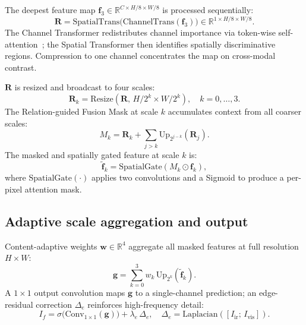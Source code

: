 \documentclass[a4paper,fleqn]{cas-dc}
\begin{document}
The deepest feature map $\mathbf{f}_3\!\in\!\mathbb{R}^{C\times H/8\times W/8}$
is processed sequentially:
\begin{equation}
  \mathbf{R} =
    \mathrm{SpatialTrans}\!\bigl(\mathrm{ChannelTrans}(\mathbf{f}_3)\bigr)
    \in \mathbb{R}^{1\times H/8\times W/8}.
  \label{eq:relmap}
\end{equation}
The Channel Transformer redistributes channel importance via token-wise
self-attention~\cite{t2tvit2021}; the Spatial Transformer then identifies
spatially discriminative regions.  Compression to one channel concentrates
the map on cross-modal contrast.

$\mathbf{R}$ is resized and broadcast to four scales:
\begin{equation}
  \mathbf{R}_k = \mathrm{Resize}(\mathbf{R},\,H/2^k\!\times\!W/2^k),
  \quad k=0,\ldots,3.
  \label{eq:broadcast}
\end{equation}
The Relation-guided Fusion Mask at scale $k$ accumulates context from all
coarser scales:
\begin{equation}
  M_k = \mathbf{R}_k + \textstyle\sum_{j>k}\mathrm{Up}_{2^{j-k}}(\mathbf{R}_j).
  \label{eq:mask}
\end{equation}
The masked and spatially gated feature at scale $k$ is:
\begin{equation}
  \tilde{\mathbf{f}}_k
    = \mathrm{SpatialGate}(M_k \odot \mathbf{f}_k),
  \label{eq:gate}
\end{equation}
where $\mathrm{SpatialGate}(\cdot)$ applies two convolutions and a Sigmoid
to produce a per-pixel attention mask.

\subsection{Adaptive scale aggregation and output}
\label{sec:method:agg}

Content-adaptive weights $\mathbf{w}\!\in\!\mathbb{R}^4$ aggregate all
masked features at full resolution $H\!\times\!W$:
\begin{equation}
  \mathbf{g} = \textstyle\sum_{k=0}^{3} w_k\,\mathrm{Up}_{2^k}(\tilde{\mathbf{f}}_k).
  \label{eq:agg}
\end{equation}
A $1\!\times\!1$ output convolution maps $\mathbf{g}$ to a single-channel
prediction; an edge-residual correction $\Delta_e$ reinforces
high-frequency detail:
\begin{equation}
  I_f = \sigma\!\bigl(\mathrm{Conv}_{1\times1}(\mathbf{g})\bigr)
        + \lambda_e\,\Delta_e,
  \quad \Delta_e = \mathrm{Laplacian}([I_\mathrm{ir};\,I_\mathrm{vis}]).
  \label{eq:output}
\end{equation}
\end{document}
